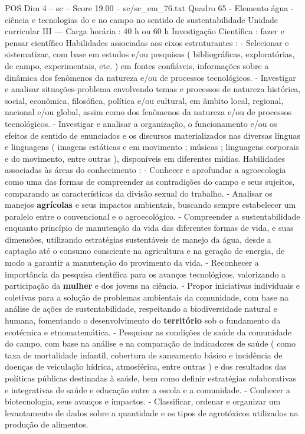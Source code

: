\begin{textsample}{POS Dim 4 – sc – Score 19.00 – sc/sc\_em\_76.txt}
Quadro 65 - Elemento água - ciência e tecnologias do e no campo no sentido de sustentabilidade Unidade curricular III — Carga horária : 40 h ou 60 h Investigação Científica : fazer e pensar científico Habilidades associadas aos eixos estruturantes : - Selecionar e sistematizar, com base em estudos e/ou pesquisas ( bibliográficas, exploratórias, de campo, experimentais, etc. ) em fontes confiáveis, informações sobre a dinâmica dos fenômenos da natureza e/ou de processos tecnológicos. - Investigar e analisar situações-problema envolvendo temas e processos de natureza histórica, social, econômica, filosófica, política e/ou cultural, em âmbito local, regional, nacional e/ou global, assim como dos fenômenos da natureza e/ou de processos tecnológicos. - Investigar e analisar a organização, o funcionamento e/ou os efeitos de sentido de enunciados e os discursos materializados nas diversas línguas e linguagens ( imagens estáticas e em movimento ; músicas ; linguagens corporais e do movimento, entre outras ), disponíveis em diferentes mídias.
Habilidades associadas às áreas do conhecimento : - Conhecer e aprofundar a agroecologia como uma das formas de compreender as contradições do campo e seus sujeitos, comparando as características da divisão sexual do trabalho. - Analisar os manejos \textbf{agrícolas} e seus impactos ambientais, buscando sempre estabelecer um paralelo entre o convencional e o agroecológico. - Compreender a sustentabilidade enquanto princípio de manutenção da vida das diferentes formas de vida, e suas dimensões, utilizando estratégias sustentáveis de manejo da água, desde a captação até o consumo consciente na agricultura e na geração de energia, de modo a garantir a manutenção do provimento da vida. - Reconhecer a importância da pesquisa científica para os avanços tecnológicos, valorizando a participação da \textbf{mulher} e dos jovens na ciência. - Propor iniciativas individuais e coletivas para a solução de problemas ambientais da comunidade, com base na análise de ações de sustentabilidade, respeitando a biodiversidade natural e humana, fomentando o desenvolvimento do \textbf{território} sob o fundamento da ecotécnica e etnomatemática. - Pesquisar as condições de saúde da comunidade do campo, com base na análise e na comparação de indicadores de saúde ( como taxa de mortalidade infantil, cobertura de saneamento básico e incidência de doenças de veiculação hídrica, atmosférica, entre outras ) e dos resultados das políticas públicas destinadas à saúde, bem como definir estratégias colaborativas e integrativas de saúde e educação entre a escola e a comunidade. - Conhecer a biotecnologia, seus avanços e impactos. - Classificar, ordenar e organizar um levantamento de dados sobre a quantidade e os tipos de agrotóxicos utilizados na produção de alimentos.

\end{textsample}
